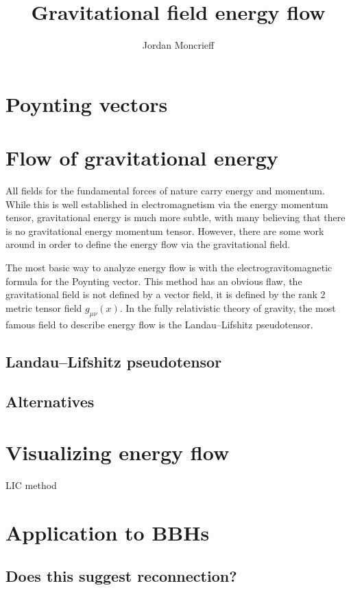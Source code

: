 \documentclass{article}
\title{Gravitational field energy flow}
\author{Jordan Moncrieff}
\begin{document}
\maketitle

\begin{abstract}

\end{abstract}

\section{Poynting vectors}


\section{Flow of gravitational energy}

All fields for the fundamental forces of nature carry energy and momentum. While this is well established in electromagnetism via the energy momentum tensor, gravitational energy is much more subtle, with many believing that there is no gravitational energy momentum tensor. However, there are some work around in order to define the energy flow via the gravitational field.

The most basic way to analyze energy flow is with the electrogravitomagnetic formula for the Poynting vector. This method has an obvious flaw, the gravitational field is not defined by a vector field, it is defined by the rank 2 metric tensor field $g_{\mu \nu}(x)$. In the fully relativistic theory of gravity, the most famous field to describe energy flow is the Landau–Lifshitz pseudotensor.

\subsection{Landau–Lifshitz pseudotensor}

\subsection{Alternatives}

\section{Visualizing energy flow}

LIC method

\section{Application to BBHs}

\subsection{Does this suggest reconnection?}




\end{document}
